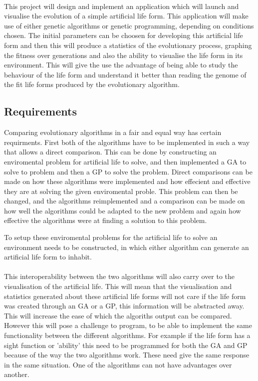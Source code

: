 \documentclass[12pt]{article}
\begin{document}
\paragraph{}
This project will design and implement an application which will launch and visualise the evolution of a
simple artificial life form. This application will make use of either genetic algorithms or genetic programming,
depending on conditions chosen. The initial parameters can be choosen for developing this artificial life form
and then this will produce a statistics of the evolutionary process, graphing the fitness over generations
and also the ability to visualise the life form in its environment. This will give the use the advantage of being
able to study the behaviour of the life form and understand it better than reading the genome of the fit life forms
produced by the evolutionary algorithm.


\paragraph{}

\subsection{Requirements}
Comparing evolutionary algorithms in a fair and equal way has certain requirments. First both of the algorithms have to be implemented in such a way that allows a direct comparison. 
This can be done by constructing an enviromental problem for artificial life to solve, and then implemented a GA to solve to problem and then a GP to solve the problem. Direct
comparisons can be made on how these algorithms were implemented and how effecient and effective they are at solving the given enviromental proble. This problem can then be changed, 
and the algorithms reimplemented and a comparison can be made on how well the algorithms could be adapted to the new problem and again how effective the algorithms were at
finding a solution to this problem.

To setup these enviromental problems for the artificial life to solve an environment needs to be constructed, in which either algorithm can generate an artificial life form
to inhabit.

\paragraph{}
This interoperability between the two algorithms will also carry over to the visualisation of the artificial life. This will mean
that the visualisation and statistics generated about these artificial life forms will not care if the life form was created
through an GA or a GP, this information will be abstracted away. This will increase the ease of which the algoriths output can
be compared. However this will pose a challenge to program, to be able to implement the same functionality between the 
different algorithms. For example if the life form has a sight function or 'ability' this need to be programmed for both
the GA and GP because of the way the two algorithms work. These need give the same response in the same situation. One of the
algorithms can not have advantages over another.
	
\end{document}
